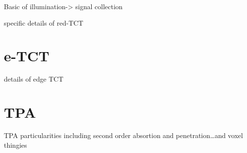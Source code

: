 Basic of illumination-> signal collection

specific details of red-TCT

\section{e-TCT} %
\label{sec:fitting_method}

details of edge TCT


\section{TPA} %
\label{sec:results_and_comparison_with_tracs_rad}

TPA particularities including second order absortion and penetration\ldots and voxel thingies


